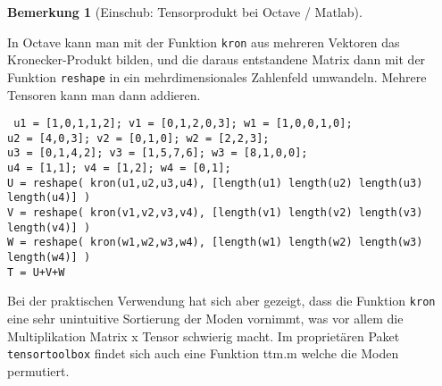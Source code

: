 \documentclass[11pt]{article} %
\theoremstyle{definition}
\newtheorem{rmk}[thm]{Bemerkung}
\numberwithin{equation}{section}
\begin{document}
\begin{rmk}[Einschub: Tensorprodukt bei Octave / Matlab]
\begin{changemargin}{0pt}{0pt}
In Octave kann man mit der Funktion \texttt{kron} aus mehreren Vektoren das Kronecker-Produkt bilden, und die daraus
entstandene Matrix dann mit der Funktion \texttt{reshape} in ein mehrdimensionales Zahlenfeld umwandeln. Mehrere
Tensoren kann man dann addieren.
\end{changemargin}

\begin{changemargin}{15pt}{15pt}
\small\texttt{\noindent
u1 = [1,0,1,1,2]; v1 = [0,1,2,0,3]; w1 = [1,0,0,1,0];\\
u2 = [4,0,3]; v2 = [0,1,0]; w2 = [2,2,3];\\
u3 = [0,1,4,2]; v3 = [1,5,7,6]; w3 = [8,1,0,0];\\
u4 = [1,1]; v4 = [1,2]; w4 = [0,1];\\
U = reshape( kron(u1,u2,u3,u4), [length(u1) length(u2) length(u3) length(u4)] )\\
V = reshape( kron(v1,v2,v3,v4), [length(v1) length(v2) length(v3) length(v4)] )\\
W = reshape( kron(w1,w2,w3,w4), [length(w1) length(w2) length(w3) length(w4)] )\\
T = U+V+W}
\end{changemargin}

Bei der praktischen Verwendung hat sich aber gezeigt, dass die Funktion \texttt{kron} eine sehr
unintuitive Sortierung der Moden vornimmt, was vor allem die Multiplikation Matrix x Tensor schwierig
macht. Im proprietären Paket \texttt{tensortoolbox} \cite{tensortools} findet sich auch eine Funktion
ttm.m welche die Moden permutiert.
\end{rmk}
\end{document}
